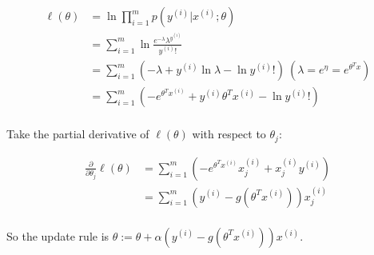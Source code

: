 \begin{answer}
	$$
	\begin{aligned}
		\ell(\theta) &= \ln\prod_{i = 1}^m p(y^{(i)}| x^{(i)}; \theta)\\
		& = \sum_{i = 1}^m\ln \frac{e^{-\lambda}\lambda^{y^{(i)}}}{y^{(i)}!}\\
		& = \sum_{i = 1}^m (-\lambda + y^{(i)}\ln\lambda - \ln y^{(i)}!)\ (\lambda = e^\eta = e^{\theta^T x})\\
		& = \sum_{i = 1}^m (-e^{\theta^T x^{(i)}} + y^{(i)}\theta^T x^{(i)}- \ln y^{(i)}!)\\
	\end{aligned}
	$$
	
	Take the partial derivative of $\ell(\theta)$ with respect to $\theta_j$:
	
	$$
	\begin{aligned}
		\frac{\partial}{\partial \theta_j} \ell(\theta) & = \sum_{i = 1}^m (-e^{\theta^T x^{(i)}} x^{(i)}_j + x^{(i)}_j y^{(i)})\\
		& = \sum_{i = 1}^m (y^{(i)} - g(\theta^T x^{(i)}))x ^{(i)}_j\\
	\end{aligned}
	$$
	
	So the update rule is $\theta := \theta + \alpha (y^{(i)} - g(\theta^T x^{(i)})) x^{(i)}$.
\end{answer}
